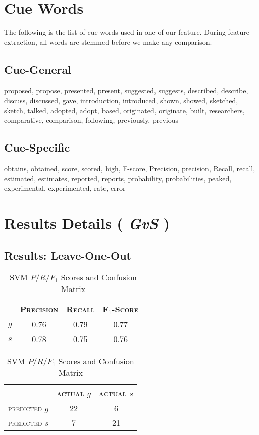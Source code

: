 \chapter{Cue Words}
\label{cuewords}
The following is the list of cue words used in one of our feature. During feature extraction, all words are stemmed before we make any comparison.
\section{Cue-General}
proposed, propose, presented, present, suggested, suggests, described, describe, discuss, discussed, gave, introduction, introduced, shown, showed, sketched, sketch, talked, adopted, adopt, based, originated, originate, built, researchers, comparative, comparison, following, previously, previous

\section{Cue-Specific}
obtains, obtained, score, scored, high, F-score, Precision, precision, Recall, recall, estimated, estimates, reported, reports, probability, probabilities, peaked, experimental, experimented, rate, error

\chapter{Results Details ( {\it GvS} )}
\label{resultsdetails}
\section{Results: Leave-One-Out}
\begin{table}[ht]
\begin{minipage}[b]{0.45\linewidth}\centering
\begin{tabular}{ c | c  c  c }
	& \textsc{Precision} & \textsc{Recall} & \textsc{F$_1$-Score} \\
	\hline
	\textsc{$g$} 	& 0.76  &    0.79   &   0.77 \\
	\textsc{$s$}	& 0.78  &    0.75   &   0.76
\end{tabular}
\end{minipage}
\hspace{0.5cm}
\begin{minipage}[b]{0.45\linewidth}\centering
\begin{tabular}{ c | c  c }
	 & \textsc{actual $g$} & \textsc{actual $s$} \\
	\hline
	\textsc{predicted $g$} 	& 22 & 6 \\
	\textsc{predicted $s$}		& 7 & 21
\end{tabular}
\end{minipage}
\caption{SVM $P/R/F_1$ Scores and Confusion Matrix}
\end{table}

